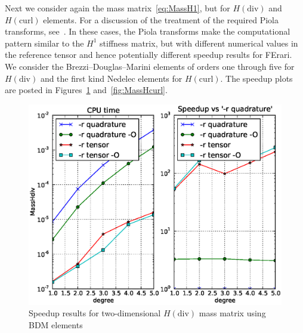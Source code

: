 Next we consider again the mass matrix~\eqref{eq:MassH1}, but for \(
H(\mathrm{div})\) and \(H(\mathrm{curl})\) elements. For a discussion
of the treatment of the required Piola transforms,
see~\cite{RognesKirbyEtAl2008}. In these cases, the Piola transforms
make the computational pattern similar to the \( H^1 \) stiffness
matrix, but with different numerical values in the reference tensor
and hence potentially different speedup results for FErari. We
consider the Brezzi--Douglas--Marini elements of orders one through
five for \( H(\mathrm{div}) \) and the first kind Nedelec elements for
\( H(\mathrm{curl}) \). The speedup plots are posted in
Figures~\ref{fig:MassHdiv} and~\ref{fig:MassHcurl}.

\begin{figure}
  \begin{center}
    \includegraphics[width=12cm]{chapters/kirby-3/eps/MassHdiv.eps}
    \caption{Speedup results for two-dimensional \( H(\mathrm{div}) \)
      mass matrix  using BDM elements}
    \label{fig:MassHdiv}
  \end{center}
\end{figure}
